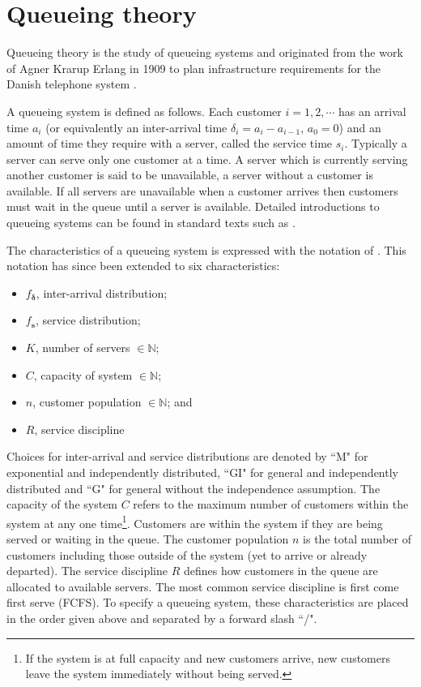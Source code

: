 \documentclass[article]{jss}
\begin{document}
\section{Queueing theory} \label{sec:queueing}

Queueing theory is the study of queueing systems and originated from the work of Agner Krarup Erlang in 1909 to plan infrastructure requirements for the Danish telephone system \citep[pg 2]{thomopoulos2012fundamentals}. 

A queueing system is defined as follows. Each customer $i = 1,2,\cdots$ has an arrival time $a_i$ (or equivalently an inter-arrival time $\delta_i = a_i - a_{i-1}$, $a_0 = 0$) and an amount of time they require with a server, called the service time $s_i$. Typically a server can serve only one customer at a time. A server which is currently serving another customer is said to be unavailable, a server without a customer is available. If all servers are unavailable when a customer arrives then customers must wait in the queue until a server is available. Detailed introductions to queueing systems can be found in standard texts such as \citet{bhat2015introduction}. 

The characteristics of a queueing system is expressed with the notation of \citet{kendall1953stochastic}. This notation has since been extended to six characteristics:
\begin{itemize}
\item $f_{\mathbf{\delta}}$, inter-arrival distribution;
\item $f_{\mathbf{s}}$, service distribution; 
\item $K$, number of servers $\in \mathbb{N}$;
\item $C$, capacity of system $\in \mathbb{N}$; 
\item $n$, customer population $\in \mathbb{N}$; and
\item $R$, service discipline
\end{itemize}

Choices for inter-arrival and service distributions are denoted by ``M" for exponential and independently distributed, ``GI" for general and independently distributed and ``G" for general without the independence assumption. The capacity of the system $C$ refers to the maximum number of customers within the system at any one time\footnote{If the system is at full capacity and new customers arrive, new customers leave the system immediately without being served.}. Customers are within the system if they are being served or waiting in the queue. The customer population $n$ is the total number of customers including those outside of the system (yet to arrive or already departed). The service discipline $R$ defines how customers in the queue are allocated to available servers. The most common service discipline is first come first serve (FCFS). To specify a queueing system, these characteristics are placed in the order given above and separated by a forward slash ``/". 
\end{document}
